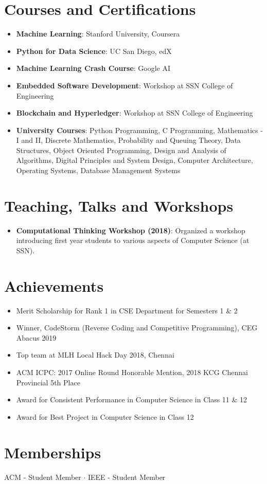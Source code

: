 \documentclass[letterpaper,11pt]{article}
\newcommand{\resumeItem}[2]{
\item\small{
\textbf{#1}{: #2 \vspace{-2pt}}
}
}
\newcommand{\resumeSubHeadingListStart}{\begin{itemize}[leftmargin=*]}
\newcommand{\resumeSubHeadingListEnd}{\end{itemize}}
\begin{document}
\section{Courses and Certifications}
\resumeSubHeadingListStart
\resumeItem{Machine Learning}{Stanford University, Coursera}
\resumeItem{Python for Data Science}{UC San Diego, edX}
\resumeItem{Machine Learning Crash Course}{Google AI}
\resumeItem{Embedded Software Development}{Workshop at SSN College of Engineering}
\resumeItem{Blockchain and Hyperledger}{Workshop at SSN College of Engineering}
\resumeItem{University Courses}{Python Programming, C Programming, Mathematics - I and II, Discrete Mathematics, Probability and Queuing Theory, Data Structures, Object Oriented Programming, Design and Analysis of Algorithms, Digital Principles and System Design, Computer Architecture, Operating Systems, Database Management Systems}
\resumeSubHeadingListEnd

\section{Teaching, Talks and Workshops}
\resumeSubHeadingListStart
\resumeItem{Computational Thinking Workshop (2018)}{Organized a workshop introducing first year students to various aspects of Computer Science (at SSN).}
\resumeSubHeadingListEnd

\section{Achievements}
\begin{itemize}[leftmargin=*]
\item Merit Scholarship for Rank 1 in CSE Department for Semesters 1 \& 2
\item Winner, CodeStorm (Reverse Coding and Competitive Programming), CEG Abacus 2019
\item Top team at MLH Local Hack Day 2018, Chennai
\item ACM ICPC: 2017 Online Round Honorable Mention, 2018 KCG Chennai Provincial 5th Place
\item Award for Consistent Performance in Computer Science in Class 11 \& 12
\item Award for Best Project in Computer Science in Class 12
\end{itemize}

\section{Memberships}
ACM - Student Member $\cdot$ IEEE - Student Member
\end{document}

